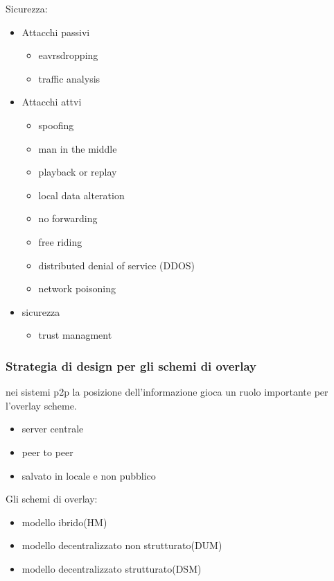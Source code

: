 Sicurezza:
\begin{itemize}
    \item Attacchi passivi
        \begin{itemize}
            \item eavrsdropping
            \item traffic analysis
        \end{itemize}
    \item Attacchi attvi
    \begin{itemize}
        \item spoofing
        \item man in the middle
        \item playback or replay
        \item local data alteration
        \item no forwarding
        \item free riding
        \item distributed denial of service (DDOS)
        \item network poisoning
    \end{itemize}
    \item sicurezza
    \begin{itemize}
        \item trust managment
    \end{itemize}
\end{itemize}

\subsubsection{Strategia di design per gli schemi di overlay}
nei sistemi p2p la posizione dell'informazione gioca un ruolo importante per l'overlay scheme.
\begin{itemize}
    \item server centrale
    \item peer to peer
    \item salvato in locale e non pubblico
\end{itemize}
Gli schemi di overlay:
\begin{itemize}
    \item modello ibrido(HM)
    \item modello decentralizzato non strutturato(DUM)
    \item modello decentralizzato strutturato(DSM)
\end{itemize}

